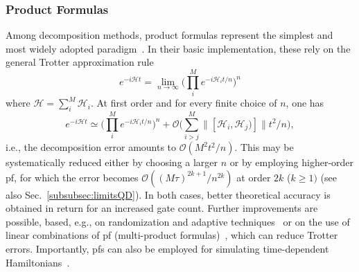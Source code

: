 \subsubsection{Product Formulas} 
Among decomposition methods, product formulas represent the simplest and most widely adopted paradigm~\cite{Lloyd96,chiesa_quantum_2019,Kim2022Scalable}. In their basic implementation, these rely on the general Trotter approximation rule~\cite{trotter1959product}
\begin{equation} \label{eq:trotter}
    e^{-i\mathcal{H}t} = \lim_{n\to\infty} \bigg(\prod_i^M e^{-i\mathcal{H}_it/n} \bigg)^n 
\end{equation}
where $\mathcal{H}=\sum_i^M \mathcal{H}_i$. At first order and for every finite choice of $n$, one has 
\begin{equation}
    e^{-i\mathcal{H}t}\simeq \biggl(\prod_i^M e^{-i\mathcal{H}_it/n} \biggr)^n + \mathcal{O}\bigl(\sum^M_{i>j} \lVert [\mathcal{H}_i, \mathcal{H}_j)]\rVert t^2 / n \bigr),
\end{equation} 
i.e., the decomposition error amounts to $\mathcal{O} ( M^2 t^2/n )$. This may be systematically reduced either by choosing a larger $n$ or by employing higher-order \gls{pf}, for which the error becomes $\mathcal{O} ((M \tau)^{2k+1} / n^{2k})$ at order $2k$ ($k \geq 1)$ (see also Sec.~\ref{subsubsec:limitsQD}). In both cases, better theoretical accuracy is obtained in return for an increased gate count. Further improvements are possible, based, e.g., on randomization and adaptive techniques~\cite{zhang2012randomized,Childs2019fasterquantum,campbell2019,Zhang2023Low} or on the use of linear combinations of \gls{pf} (multi-product formulas)~\cite{chin2010multi,Vazquez2022}, which can reduce Trotter errors. 
Importantly, \glspl{pf} can also be employed for simulating time-dependent Hamiltonians~\cite{wiebe2010higher,poulin2011quantum,watkins2022timedependent}.


